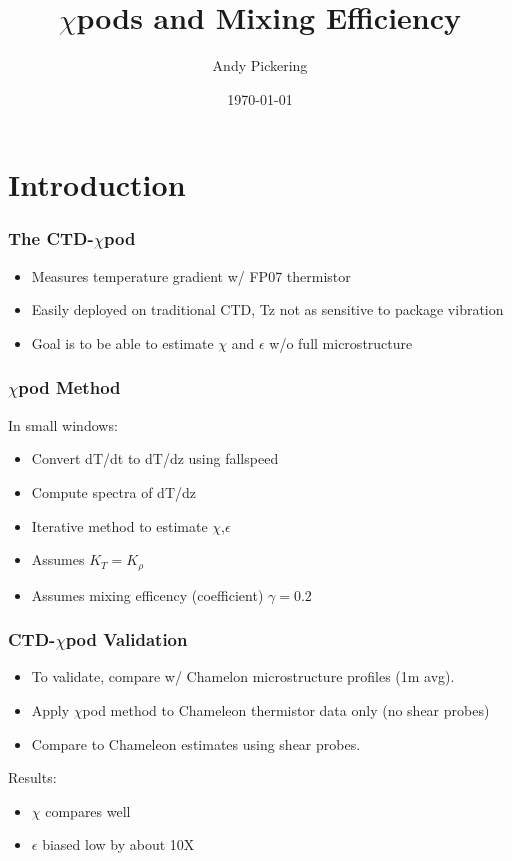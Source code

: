 \documentclass{beamer}
\title{$\chi$pods and Mixing Efficiency}
\author{Andy Pickering}
\date{\today}
\begin{document}
\frame{\titlepage}

\section[Outline]{}
\frame{\tableofcontents}


\section{Introduction}


\begin{frame}
 \frametitle{The CTD-$\chi$pod}

   \begin{itemize}
  \item Measures temperature gradient w/ FP07 thermistor
  \item Easily deployed on traditional CTD, Tz not as sensitive to package vibration
  \item Goal is to be able to estimate $\chi$ and $\epsilon$ w/o full microstructure
  \end{itemize}

\end{frame}


\begin{frame}
 \frametitle{$\chi$pod Method}

In small windows:
   \begin{itemize}
  \item Convert dT/dt to dT/dz using fallspeed
  \item  Compute spectra of dT/dz
  \item Iterative method to estimate $\chi$,$\epsilon$
  \item Assumes $K_T=K_{\rho}$
  \item Assumes mixing efficency (coefficient) $\gamma=0.2$
  \end{itemize}

\end{frame}



\begin{frame}
 \frametitle{CTD-$\chi$pod Validation}

   \begin{itemize}
  \item To validate, compare w/ Chamelon microstructure profiles (1m avg).
  \item Apply $\chi$pod method to Chameleon thermistor data only (no shear probes)
  \item Compare to Chameleon estimates using shear probes.
  \end{itemize}

Results:
   \begin{itemize}
  \item $\chi$ compares well
  \item $\epsilon$ biased low by about 10X
    \end{itemize}

\end{frame}
\end{document}
